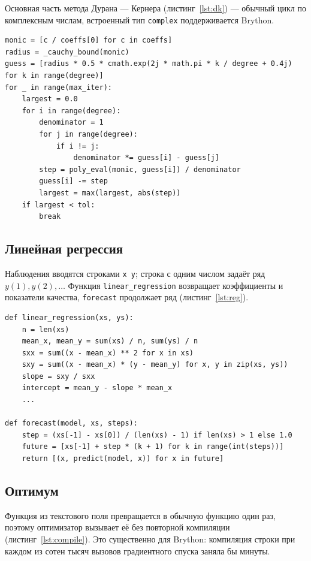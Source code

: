 \documentclass[14pt,a4paper]{extarticle}
\begin{document}
Основная часть метода Дурана --- Кернера (листинг~\ref{lst:dk}) --- обычный цикл по
комплексным числам, встроенный тип \texttt{complex} поддерживается Brython.

\begin{lstlisting}[style=python, caption={Метод Дурана --- Кернера}, label={lst:dk}]
monic = [c / coeffs[0] for c in coeffs]
radius = _cauchy_bound(monic)
guess = [radius * 0.5 * cmath.exp(2j * math.pi * k / degree + 0.4j) for k in range(degree)]
for _ in range(max_iter):
    largest = 0.0
    for i in range(degree):
        denominator = 1
        for j in range(degree):
            if i != j:
                denominator *= guess[i] - guess[j]
        step = poly_eval(monic, guess[i]) / denominator
        guess[i] -= step
        largest = max(largest, abs(step))
    if largest < tol:
        break
\end{lstlisting}

\subsection{Линейная регрессия}

Наблюдения вводятся строками \texttt{x y}; строка с одним числом задаёт ряд
$y(1),y(2),\dots$ Функция \texttt{linear\_regression} возвращает коэффициенты и
показатели качества, \texttt{forecast} продолжает ряд (листинг~\ref{lst:reg}).

\begin{lstlisting}[style=python, caption={Регрессия и прогноз}, label={lst:reg}]
def linear_regression(xs, ys):
    n = len(xs)
    mean_x, mean_y = sum(xs) / n, sum(ys) / n
    sxx = sum((x - mean_x) ** 2 for x in xs)
    sxy = sum((x - mean_x) * (y - mean_y) for x, y in zip(xs, ys))
    slope = sxy / sxx
    intercept = mean_y - slope * mean_x
    ...

def forecast(model, xs, steps):
    step = (xs[-1] - xs[0]) / (len(xs) - 1) if len(xs) > 1 else 1.0
    future = [xs[-1] + step * (k + 1) for k in range(int(steps))]
    return [(x, predict(model, x)) for x in future]
\end{lstlisting}

\subsection{Оптимум}

Функция из текстового поля превращается в обычную функцию один раз, поэтому
оптимизатор вызывает её без повторной компиляции (листинг~\ref{lst:compile}). Это
существенно для Brython: компиляция строки при каждом из сотен тысяч вызовов
градиентного спуска заняла бы минуты.
\end{document}
